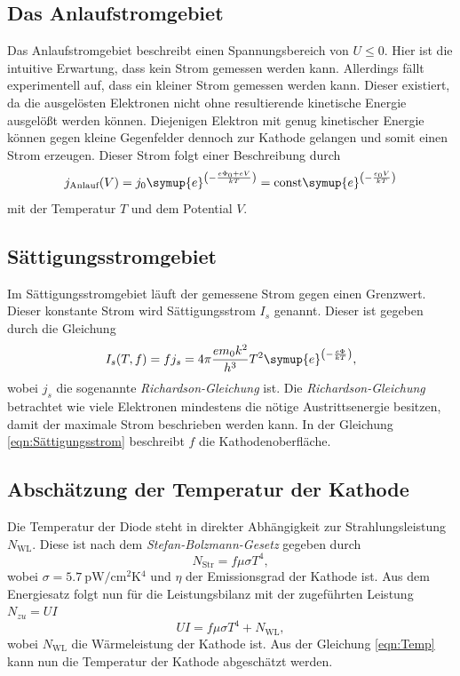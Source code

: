 \subsection{Das Anlaufstromgebiet}
\label{subsec:Anlaufstromgebiet}
Das Anlaufstromgebiet beschreibt einen Spannungsbereich von $U \leq 0$. Hier ist die intuitive Erwartung, dass kein Strom gemessen werden kann. Allerdings fällt experimentell
auf, dass ein kleiner Strom gemessen werden kann. Dieser existiert, da die ausgelösten Elektronen nicht ohne resultierende kinetische Energie ausgelößt werden können. Diejenigen
Elektron mit genug kinetischer Energie können gegen kleine Gegenfelder dennoch zur Kathode gelangen und somit einen Strom erzeugen. Dieser Strom folgt einer 
Beschreibung durch
\begin{equation}
    \label{eqn:Anlaufstromgebiet}
    j_{\text{Anlauf}}(V) = j_0 \symup{e}^{\left(-\frac{e\Phi_0 + eV}{kT}\right)} = \text{const}\symup{e}^{\left(-\frac{e_0V}{kT}\right)}
\end{equation}
mit der Temperatur $T$ und dem Potential $V$.

\subsection{Sättigungsstromgebiet}
\label{subsec:Sättigungsstromgebiet}
Im Sättigungsstromgebiet läuft der gemessene Strom gegen einen Grenzwert. Dieser konstante Strom wird Sättigungsstrom $I_s$ genannt. Dieser ist gegeben durch die Gleichung
\begin{equation}
    \label{eqn:Sättigungsstrom}
    I_s(T,f) = f j_s = 4\pi\frac{em_0k^2}{h^3}T^2\symup{e}^{\left(-\frac{e\Phi}{kT}\right)},
\end{equation}
wobei $j_s$ die sogenannte \textit{Richardson-Gleichung} ist. Die \textit{Richardson-Gleichung} betrachtet wie viele Elektronen mindestens die nötige Austrittsenergie besitzen, 
damit der maximale Strom beschrieben werden kann. In der Gleichung \ref{eqn:Sättigungsstrom} beschreibt $f$ die Kathodenoberfläche.

\subsection{Abschätzung der Temperatur der Kathode}
\label{subsec:Temperatur}
Die Temperatur der Diode steht in direkter Abhängigkeit zur Strahlungsleistung $N_{\text{WL}}$. Diese ist nach dem \textit{Stefan-Bolzmann-Gesetz} gegeben durch
\begin{equation*}
    N_{\text{Str}} = f\mu\sigma T^4 ,
\end{equation*}
wobei $\sigma = \qty{5.7}{\pico\watt\per\centi\metre\squared\kelvin^4}$ und $\eta$ der Emissionsgrad der Kathode ist.
Aus dem Energiesatz folgt nun für die Leistungsbilanz mit der zugeführten Leistung $N_{zu} = UI$
\begin{equation}
    \label{eqn:Temp}
    UI = f\mu\sigma T^4 + N_{\text{WL}} ,
\end{equation}
wobei $N_{\text{WL}}$ die Wärmeleistung der Kathode ist. Aus der Gleichung \ref{eqn:Temp} kann nun die Temperatur der Kathode abgeschätzt werden.